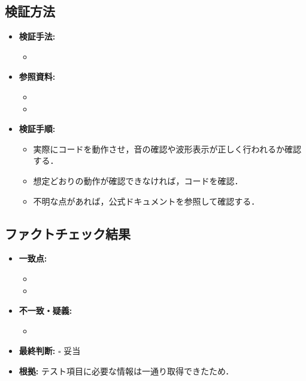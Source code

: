 \documentclass[10pt]{ltjsarticle} %
\begin{document}
\subsection{検証方法}
\begin{itemize}
    \item \textbf{検証手法:}
    \begin{itemize}
        \item[$\circ$] [テストコードが正しく動作するか実際に確認する．]
    \end{itemize}
    \item \textbf{参照資料:} \\
    \begin{itemize}
        \item[$\circ$] [Processing, Processing Serial library Reference, \url{https://processing.org/reference/libraries/serial/index.html}]
        \item[$\circ$] [compartmental.net, Minim, \url{https://code.compartmental.net/tools/minim/}]
    \end{itemize}
    \item \textbf{検証手順:}
    \begin{itemize}
        \item [$\circ$] 実際にコードを動作させ，音の確認や波形表示が正しく行われるか確認する．
        \item [$\circ$] 想定どおりの動作が確認できなければ，コードを確認．
        \item 不明な点があれば，公式ドキュメントを参照して確認する．
    \end{itemize}
\end{itemize}
\subsection{ファクトチェック結果}
\begin{itemize}
    \item \textbf{一致点:}
    \begin{itemize}
        \item[$\circ$] [送信した周波数より1オクターブ下の周波数でProcessing内で周波数計測・波形表示ができることを確認した．]
        \item[$\circ$] [シリアル受信した音数と譜面配列内の音数が一致することを確認した．]
    \end{itemize}
    \item \textbf{不一致・疑義:}
    \begin{itemize}
        \item[$\circ$] [特になし．]
    \end{itemize}
    \item \textbf{最終判断:} \quad $\square$ 妥当 \\ 
    \item \textbf{根拠:} テスト項目に必要な情報は一通り取得できたため．\\
\end{itemize}
\end{document}
